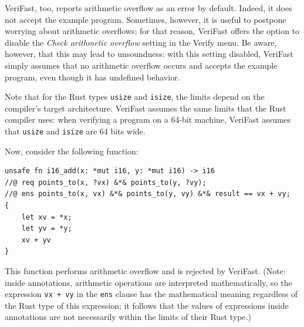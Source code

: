 \documentclass{article}
\begin{document}
VeriFast, too, reports arithmetic overflow as an error by default. Indeed, it does not accept the example program. Sometimes, however, it is useful to postpone worrying about arithmetic overflows; for that reason, VeriFast offers the option to disable the \emph{Check arithmetic overflow} setting in the Verify menu. Be aware, however, that this may lead to unsoundness: with this setting disabled, VeriFast simply assumes that no arithmetic overflow occurs and accepts the example program, even though it has undefined behavior.

Note that for the Rust types \lstinline|usize| and \lstinline|isize|, the limits depend on the compiler's target architecture. VeriFast assumes the same limits that the Rust compiler uses: when verifying a program on a 64-bit machine, VeriFast assumes that \lstinline|usize| and \lstinline|isize| are 64 bits wide.

Now, consider the following function:
\begin{lstlisting}
unsafe fn i16_add(x: *mut i16, y: *mut i16) -> i16
//@ req points_to(x, ?vx) &*& points_to(y, ?vy);
//@ ens points_to(x, vx) &*& points_to(y, vy) &*& result == vx + vy;
{
    let xv = *x;
    let yv = *y;
    xv + yv
}
\end{lstlisting}
This function performs arithmetic overflow and is rejected by VeriFast. (Note: inside annotations, arithmetic operations are interpreted mathematically, so the expression \verb|vx + vy| in the \verb|ens| clause has the mathematical meaning regardless of the Rust type of this expression; it follows that the values of expressions inside annotations are not necessarily within the limits of their Rust type.)
\end{document}
